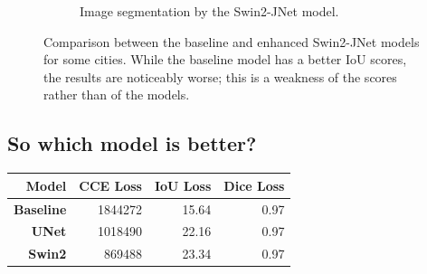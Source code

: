 \begin{figure}[h]
\begin{subfigure}{.5\textwidth}
		\caption{Image segmentation by the Swin2-JNet model.}
	\end{subfigure}
	\caption{Comparison between the baseline and enhanced Swin2-JNet models for some cities. While the baseline model has a better IoU scores, the results are noticeably worse; this is a weakness of the scores rather than of the models.}
\end{figure}

\subsection{So which model is better?}

\begin{table}[h]
	\centering
	\begin{tabular}{>{\bfseries}r | r r r}
		\toprule
		Model & CCE Loss & IoU Loss & Dice Loss \\
		\midrule
		Baseline & \num{1844272} & 15.64 & 0.97 \\
		UNet & \num{1018490} & 22.16 & 0.97 \\
		Swin2 & \num{869488} & 23.34 & 0.97 \\
		\bottomrule
	\end{tabular}
\end{table}
